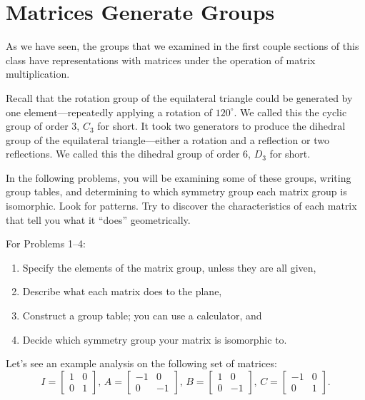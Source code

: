 \documentclass[../textbook.tex]{subfiles}
\begin{document}
\section{Matrices Generate Groups}

As we have seen, the groups that we examined in the first couple sections of this class have representations with matrices under the operation of matrix multiplication.

Recall that the rotation group of the equilateral triangle could be generated by one element---repeatedly applying a rotation of $120^\circ$. We called this the cyclic group of order $3$, $C_3$ for short. It took two generators to produce the dihedral group of the equilateral triangle---either a rotation and a reflection or two reflections. We called this the dihedral group of order $6$, $D_3$ for short.

In the following problems, you will be examining some of these groups, writing group tables, and determining to which symmetry group each matrix group is isomorphic. Look for patterns. Try to discover the characteristics of each matrix that tell you what it ``does'' geometrically.

For Problems 1--4:
\begin{enumerate}[label=(\alph*)]
\item Specify the elements of the matrix group, unless they are all given, %
\item Describe what each matrix does to the plane, %
\item Construct a group table; you can use a calculator, and %
\item Decide which symmetry group your matrix is isomorphic to. %
\end{enumerate}

\noindent Let's see an example analysis on the following set of matrices:
$$I=\left[\begin{array}{cc} 1 & 0 \\ 0 & 1 \end{array}\right],\, A=\left[\begin{array}{cc} -1 & 0 \\ 0 & -1 \end{array}\right],\,  B=\left[\begin{array}{cc} 1 & 0 \\ 0 & -1 \end{array}\right],\, C=\left[\begin{array}{cc} -1 & 0 \\ 0 & 1 \end{array}\right].$$
\end{document}
